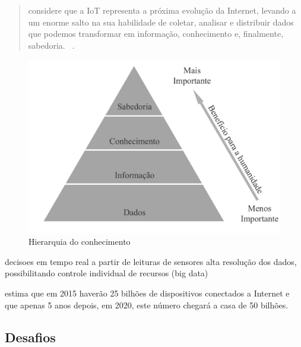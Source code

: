 \documentclass[twoside,english,brazilian]{UNISINOSmonografia}
\begin{document}
		\begin{quote}
			considere que a IoT representa a próxima evolução da Internet, 
			levando a um enorme salto na sua habilidade de coletar, analisar e 
			distribuir dados que podemos transformar em informação, 
			conhecimento e, finalmente, sabedoria.~
			\cite[p.~2]{Cisco2011}.
		\end{quote}
		
		\begin{figure}
			\caption{Hierarquia do conhecimento}
			\label{fig:wkid}
			\centering
			\begin{minipage}{.8\textwidth}
				\includegraphics[width=\textwidth]{wkid}
			\end{minipage}
		\end{figure}
		
decisoes em tempo real a partir de leituras de sensores
alta resolução dos dados, possibilitando controle individual de recursos (big 
data)

		
		 estima que em 2015 haverão 25 bilhões de 
		dispositivos conectados a Internet e que apenas 5 anos depois, em 
		2020, este número chegará a casa de 50 bilhões.
		
\subsection{Desafios}

\end{document}
